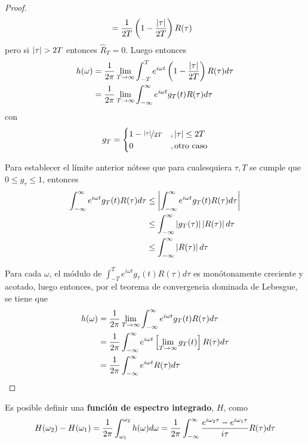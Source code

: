 \begin{proof}
\begin{align*}
&=
\frac{1}{2T} \left( 1 - \frac{\left| \tau \right|}{2T} \right) R(\tau)
\end{align*}
pero si $\abso{\tau}>2T$ entonces $\widehat{R}_T = 0$. Luego entonces
\begin{align*}
h(\omega) &=
\frac{1}{2\pi} \lim_{T\rightarrow \infty}
\int_{-T}^{T} e^{i \omega t} \left( 1 - \frac{\left| \tau \right|}{2T} \right) R(\tau) d\tau\\
&=
\frac{1}{2\pi} \lim_{T\rightarrow \infty}
\int_{-\infty}^{\infty} e^{i \omega t} g_T(t) R(\tau) d\tau
\end{align*}
con
\begin{equation}
g_T = \begin{cases}
1 - \nicefrac{\left| \tau \right|}{2T} &, \left| \tau \right| \leq 2T \\
0 &, \text{otro caso}
\end{cases}
\end{equation}

Para establecer el límite anterior nótese que para cualesquiera $\tau, T$ se cumple que $0\leq g_\tau \leq 1$, entonces
\begin{align*}
\int_{-\infty}^{\infty} e^{i \omega t} g_T(t) R(\tau) d\tau
&\leq
\left| \int_{-\infty}^{\infty} e^{i \omega t} g_T(t) R(\tau) d\tau  \right| \\
&\leq
\int_{-\infty}^{\infty} \left| g_T(\tau) \right| \left|  R(\tau) \right| d\tau \\
&\leq
\int_{-\infty}^{\infty} \left|  R(\tau) \right| d\tau 
\end{align*}

Para cada $\omega$, el módulo de $\int_{-T}^{T} e^{i \omega t} g_\tau(t) R(\tau) d\tau$ es monótonamente creciente y acotado, luego entonces, por el teorema de convergencia dominada de Lebesgue, se tiene que
\begin{align*}
h(\omega) &=
\frac{1}{2\pi} \lim_{T\rightarrow \infty}
\int_{-\infty}^{\infty} e^{i \omega t} g_T(t) R(\tau) d\tau\\
&=
\frac{1}{2\pi} 
\int_{-\infty}^{\infty} e^{i \omega t} \left[ \lim_{T\rightarrow \infty} g_T(t) \right] R(\tau) d\tau\\
&=
\frac{1}{2\pi} 
\int_{-\infty}^{\infty} e^{i \omega t} R(\tau) d\tau\\
\end{align*}
\end{proof}

Es posible definir una \textbf{función de espectro integrado}, $H$, como
\begin{equation}
H(\omega_2) - H(\omega_1) = \frac{1}{2 \pi} \int_{\omega_1}^{\omega_2} h(\omega) d\omega =
\frac{1}{2\pi} \int_{-\infty}^{\infty} \frac{e^{i \omega_2 \tau}-e^{i \omega_1 \tau}}{i \tau} R(\tau) d\tau
\end{equation}

